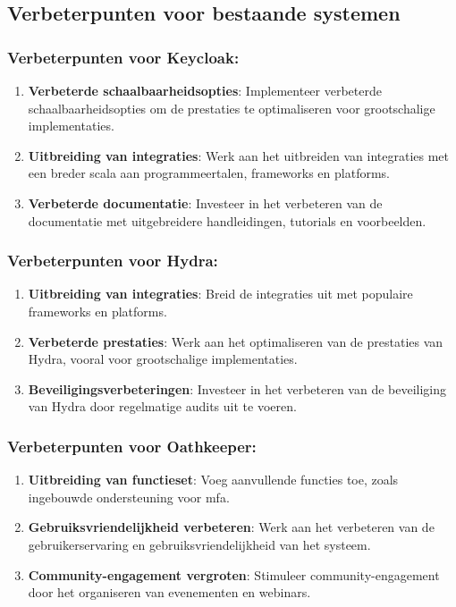 \subsection{Verbeterpunten voor bestaande systemen}%
\label{subsec:verbeteringen-voor-bestaande-systemen}
\subsubsection{Verbeterpunten voor Keycloak:}%
\label{subsubsec:verbeteringen-voor-keycloak}
\begin{enumerate}[label=\arabic*.]
    \item \textbf{Verbeterde schaalbaarheidsopties}: Implementeer verbeterde schaalbaarheidsopties om de prestaties te optimaliseren voor grootschalige implementaties.
    \item \textbf{Uitbreiding van integraties}: Werk aan het uitbreiden van integraties met een breder scala aan programmeertalen, frameworks en platforms.
    \item \textbf{Verbeterde documentatie}: Investeer in het verbeteren van de documentatie met uitgebreidere handleidingen, tutorials en voorbeelden.
\end{enumerate}

\subsubsection{Verbeterpunten voor Hydra:}%
\label{subsubsec:verbeteringen-voor-hydra}
\begin{enumerate}[label=\arabic*.]
    \item \textbf{Uitbreiding van integraties}: Breid de integraties uit met populaire frameworks en platforms.
    \item \textbf{Verbeterde prestaties}: Werk aan het optimaliseren van de prestaties van Hydra, vooral voor grootschalige implementaties.
    \item \textbf{Beveiligingsverbeteringen}: Investeer in het verbeteren van de beveiliging van Hydra door regelmatige audits uit te voeren.
\end{enumerate}

\subsubsection{Verbeterpunten voor Oathkeeper:}%
\label{subsubsec:verbeteringen-voor-oathkeeper}
\begin{enumerate}[label=\arabic*.]
    \item \textbf{Uitbreiding van functieset}: Voeg aanvullende functies toe, zoals ingebouwde ondersteuning voor \gls{mfa}.
    \item \textbf{Gebruiksvriendelijkheid verbeteren}: Werk aan het verbeteren van de gebruikerservaring en gebruiksvriendelijkheid van het systeem.
    \item \textbf{Community-engagement vergroten}: Stimuleer community-engagement door het organiseren van evenementen en webinars.
\end{enumerate}

